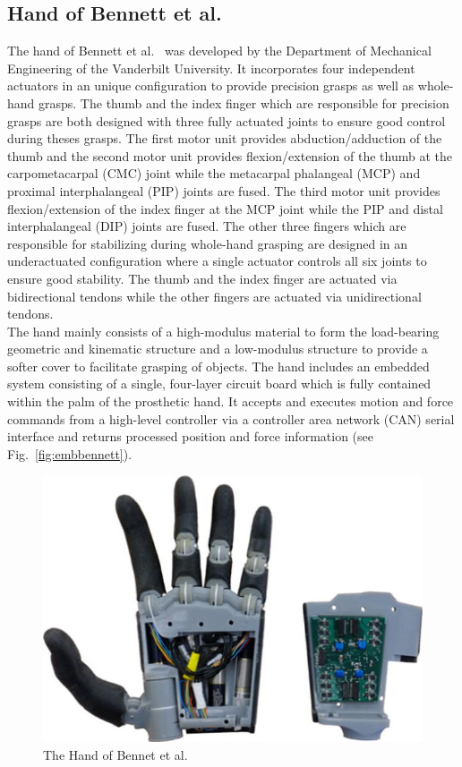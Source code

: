 \documentclass[a4paper, 10pt, conference]{ieeeconf}      %
\begin{document}
\subsection{Hand of Bennett et al.}

The hand of Bennett et al.~\cite{bennett} was developed by the Department of Mechanical Engineering of the Vanderbilt University. It incorporates four independent actuators in an unique configuration to provide precision grasps as well as whole-hand grasps. The thumb and the index finger which are responsible for precision grasps are both designed with three fully actuated joints to ensure good control during theses grasps. The first motor unit provides abduction/adduction of the thumb and the second motor unit provides flexion/extension of the thumb at the carpometacarpal (CMC) joint while the metacarpal phalangeal (MCP) and proximal interphalangeal (PIP) joints are fused. The third motor unit provides flexion/extension of the index finger at the MCP joint while the PIP and distal interphalangeal (DIP) joints are fused. The other three fingers which are responsible for stabilizing during whole-hand grasping are designed in an underactuated configuration where a single actuator controls all six joints to ensure good stability. The thumb and the index finger are actuated via bidirectional tendons while the other fingers are actuated via unidirectional tendons.\\
The hand mainly consists of a high-modulus material to form the load-bearing geometric and kinematic structure and a low-modulus structure to provide a softer cover to facilitate grasping of objects. The hand includes an embedded system consisting of a single, four-layer circuit board which is fully contained within the palm of the prosthetic hand. It accepts and executes motion and force commands from a high-level controller via a controller area network (CAN) serial interface and returns processed position and force information (see Fig.~\ref{fig:embbennett}).

\begin{figure}[h]

	\centering
	\includegraphics[scale=0.7]{images/Bennett}
	
	\caption{The Hand of Bennet et al.}
\end{figure}
\end{document}
